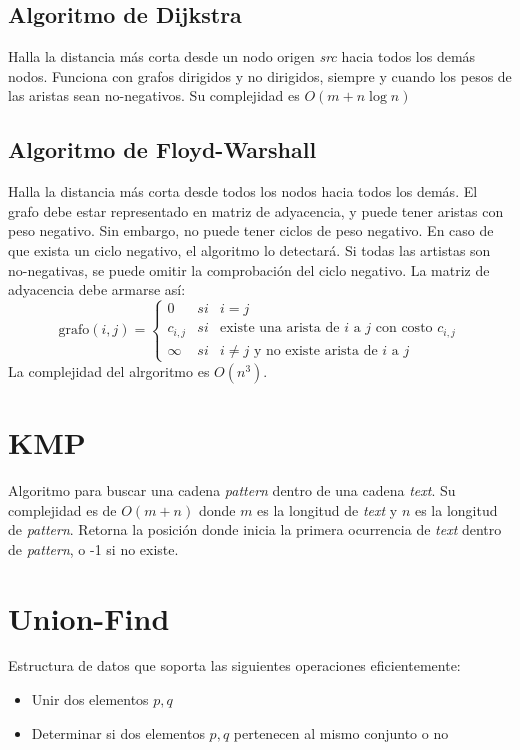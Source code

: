 \documentclass{article}
\begin{document}
\begin{multicols}{2}
	\subsection{Algoritmo de Dijkstra}
	Halla la distancia más corta desde un nodo origen \emph{src} hacia todos los demás nodos. Funciona con grafos dirigidos y no dirigidos, siempre y cuando los pesos de las aristas sean no-negativos. Su complejidad es \( O(m + n\log n) \)
	
	
	\subsection{Algoritmo de Floyd-Warshall}
	Halla la distancia más corta desde todos los nodos hacia todos los demás. El grafo debe estar representado en matriz de adyacencia, y puede tener aristas con peso negativo. Sin embargo, no puede tener ciclos de peso negativo. En caso de que exista un ciclo negativo, el algoritmo lo detectará. Si todas las artistas son no-negativas, se puede omitir la comprobación del ciclo negativo.
	La matriz de adyacencia debe armarse así:
	\[
		\text{grafo}(i, j) = \left \{ 
			\begin{array}{lcc}
				0 & si & i = j
				\\ c_{i,j} & si & \text{existe una arista de } i \text{ a } j \text{ con costo } c_{i,j}
				\\ \infty & si & i \neq j \text{ y no existe arista de } i \text{ a } j 
			\end{array}
		\right.
	\]
	La complejidad del alrgoritmo es \( O(n^3) \).
	

\section{KMP}
Algoritmo para buscar una cadena \emph{pattern} dentro de una cadena \emph{text}. Su complejidad es de \( O(m+n) \) donde \( m \) es la longitud de \emph{text} y \( n \) es la longitud de \emph{pattern}. Retorna la posición donde inicia la primera ocurrencia de \emph{text} dentro de \emph{pattern}, o -1 si no existe.


\section{Union-Find}
Estructura de datos que soporta las siguientes operaciones eficientemente:
\begin{itemize}
\item Unir dos elementos \( p, q \)
\item Determinar si dos elementos \( p, q \) pertenecen al mismo conjunto o no
\end{itemize}



\end{multicols}
\end{document}
